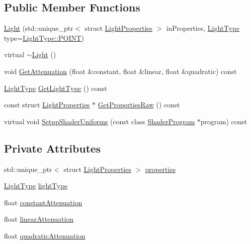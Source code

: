 \subsection*{Public Member Functions}
\begin{DoxyCompactItemize}
\item 
\hyperlink{class_light_adca12f0d5470bc3f2e6e77233ab3dcf1}{Light} (std\+::unique\+\_\+ptr$<$ struct \hyperlink{struct_light_properties}{Light\+Properties} $>$ in\+Properties, \hyperlink{class_light_a661d9480e01af8b1612860b9630ef5f8}{Light\+Type} type=\hyperlink{class_light_a661d9480e01af8b1612860b9630ef5f8aaebdbcb765394d25d6a604589a890f82}{Light\+Type\+::\+P\+O\+I\+N\+T})
\item 
virtual \hyperlink{class_light_ad0e59fad13bb6cfadc25b2c477e9ddc7}{$\sim$\+Light} ()
\item 
void \hyperlink{class_light_a2d3f34b821c0cb0b5baa664ee91d309f}{Get\+Attenuation} (float \&constant, float \&linear, float \&quadratic) const 
\item 
\hyperlink{class_light_a661d9480e01af8b1612860b9630ef5f8}{Light\+Type} \hyperlink{class_light_a393ede80ccba5f4314135011a665afab}{Get\+Light\+Type} () const 
\item 
const struct \hyperlink{struct_light_properties}{Light\+Properties} $\ast$ \hyperlink{class_light_a074230bc62c5bf705bc39c1de64474c0}{Get\+Properties\+Raw} () const 
\item 
virtual void \hyperlink{class_light_a360ea479af434502737f6b5c0b0ff3d9}{Setup\+Shader\+Uniforms} (const class \hyperlink{class_shader_program}{Shader\+Program} $\ast$program) const 
\end{DoxyCompactItemize}
\subsection*{Private Attributes}
\begin{DoxyCompactItemize}
\item 
std\+::unique\+\_\+ptr$<$ struct \hyperlink{struct_light_properties}{Light\+Properties} $>$ \hyperlink{class_light_a74eba4cac1cc27e741230fbda32fceef}{properties}
\item 
\hyperlink{class_light_a661d9480e01af8b1612860b9630ef5f8}{Light\+Type} \hyperlink{class_light_ab0c279c927973443f7b52fc924b489aa}{light\+Type}
\item 
float \hyperlink{class_light_afef6c00a21aa16dc6cc7a7fb1639d2fa}{constant\+Attenuation}
\item 
float \hyperlink{class_light_afcb2da592197efae015ae16c1c5bfceb}{linear\+Attenuation}
\item 
float \hyperlink{class_light_a0f24dde11cbbd12d0f0309e189f3640c}{quadratic\+Attenuation}
\end{DoxyCompactItemize}
